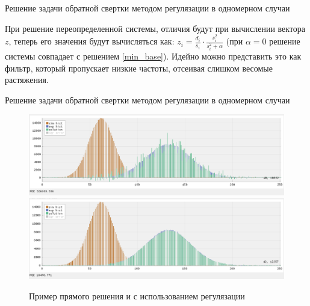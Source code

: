 \documentclass[fullscreen=true,russian,compress,%
	hyperref={unicode,bookmarks=false}]{presentation}
\begin{document}
\begin{frame}{Решение задачи обратной свертки методом регулязации в одномерном случаи}

При решение переопределенной системы, отличия будут при вычислении вектора $z$, теперь его значения будут вычисляться как:
$z_{i} = \frac{d_{i}}{s_{i}} \cdot \frac{s^2_{i}}{s^2_{i} + \alpha}$ (при $\alpha = 0$ решение системы
совпадает с решением \eqref{min_base}). Идейно можно представить это как фильтр, который пропускает низкие частоты, отсеивая слишком 
весомые растяжения.

\end{frame}

\begin{frame}{Решение задачи обратной свертки методом регулязации в одномерном случаи}
   \begin{figure}[h]
      \includegraphics[width=\linewidth]{images/example_without_regulazation.png}
      \includegraphics[width=\linewidth]{images/example_regulazation.png}
      \caption{Пример прямого решения и с использованием регулязации}
   \end{figure}
   
\end{frame}
\end{document}

